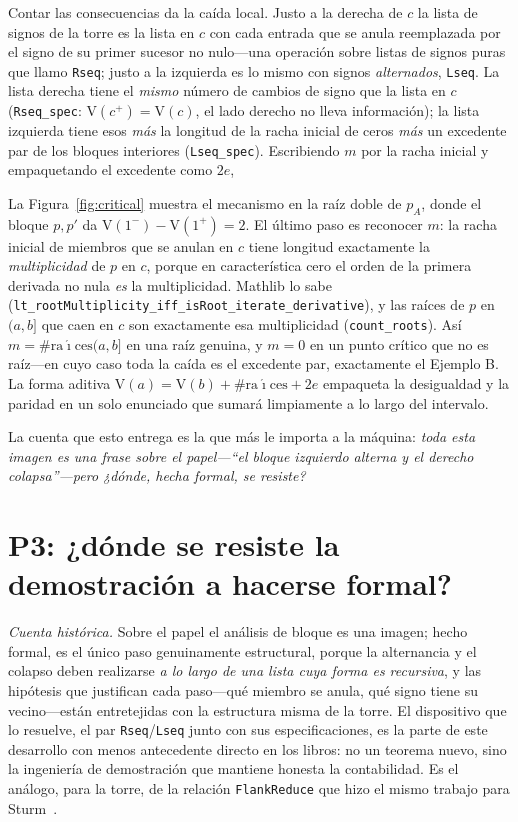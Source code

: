\documentclass[11pt]{article}
\newcommand{\lean}[1]{\texttt{#1}}
\newcommand{\V}{\mathrm{V}}
\newcommand{\keyeq}[1]{\begin{center}\keybox{$\displaystyle #1$}\end{center}}
\begin{document}
Contar las consecuencias da la ca\'ida local. Justo a la derecha de $c$ la lista de signos de la torre
es la lista en $c$ con cada entrada que se anula reemplazada por el signo de su primer sucesor no
nulo---una operaci\'on sobre listas de signos puras que llamo \lean{Rseq}; justo a la izquierda es lo
mismo con signos \emph{alternados}, \lean{Lseq}. La lista derecha tiene el \emph{mismo} n\'umero de
cambios de signo que la lista en $c$ (\lean{Rseq\_spec}: $\V(c^+)=\V(c)$, el lado derecho no lleva
informaci\'on); la lista izquierda tiene esos \emph{m\'as} la longitud de la racha inicial de ceros
\emph{m\'as} un excedente par de los bloques interiores (\lean{Lseq\_spec}). Escribiendo $m$ por la
racha inicial y empaquetando el excedente como $2e$,
\keyeq{\V(c^-)\ =\ \V(c^+)\ +\ m\ +\ 2e .}
La Figura~\ref{fig:critical} muestra el mecanismo en la ra\'iz doble de $p_A$, donde el bloque $p,p'$
da $\V(1^-)-\V(1^+)=2$. El \'ultimo paso es reconocer $m$: la racha inicial de miembros que se anulan
en $c$ tiene longitud exactamente la \emph{multiplicidad} de $p$ en $c$, porque en caracter\'istica
cero el orden de la primera derivada no nula \emph{es} la multiplicidad. Mathlib lo sabe
(\lean{lt\_rootMultiplicity\_iff\_isRoot\_iterate\_derivative}), y las ra\'ices de $p$ en $(a,b]$ que
caen en $c$ son exactamente esa multiplicidad (\lean{count\_roots}). As\'i $m=\#\mathrm{ra\acute{\imath}ces}(a,b]$
en una ra\'iz genuina, y $m=0$ en un punto cr\'itico que no es ra\'iz---en cuyo caso toda la ca\'ida es
el excedente par, exactamente el Ejemplo B. La forma aditiva $\V(a)=\V(b)+\#\mathrm{ra\acute{\imath}ces}+2e$
empaqueta la desigualdad y la paridad en un solo enunciado que sumar\'a limpiamente a lo largo del
intervalo.

La cuenta que esto entrega es la que m\'as le importa a la m\'aquina: \emph{toda esta imagen es una
frase sobre el papel---``el bloque izquierdo alterna y el derecho colapsa''---pero ¿d\'onde, hecha
formal, se resiste?}

\section{P3: ¿d\'onde se resiste la demostraci\'on a hacerse formal?}\label{sec:q3}

\emph{Cuenta hist\'orica.} Sobre el papel el an\'alisis de bloque es una imagen; hecho formal, es el
\'unico paso genuinamente estructural, porque la alternancia y el colapso deben realizarse \emph{a lo
largo de una lista cuya forma es recursiva}, y las hip\'otesis que justifican cada paso---qu\'e miembro
se anula, qu\'e signo tiene su vecino---est\'an entretejidas con la estructura misma de la torre. El
dispositivo que lo resuelve, el par \lean{Rseq}/\lean{Lseq} junto con sus especificaciones, es la parte
de este desarrollo con menos antecedente directo en los libros: no un teorema nuevo, sino la
ingenier\'ia de demostraci\'on que mantiene honesta la contabilidad. Es el an\'alogo, para la torre, de
la relaci\'on \lean{FlankReduce} que hizo el mismo trabajo para Sturm~\cite{sturmlean}.
\end{document}
